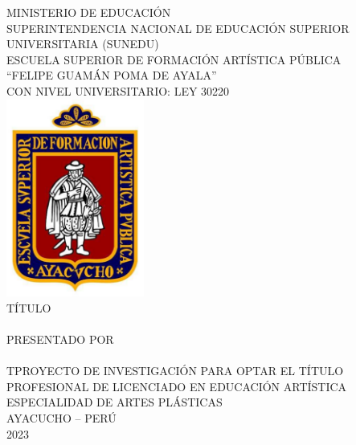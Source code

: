 \documentclass[12pt,a4paper]{article}
\begin{document}
\setlength{\abovecaptionskip}{0pt}
\setlength{\belowcaptionskip}{0pt}

\thispagestyle{empty}

{
\normalsize\centering\thispagestyle{empty}
MINISTERIO DE EDUCACIÓN
\\SUPERINTENDENCIA NACIONAL DE EDUCACIÓN SUPERIOR UNIVERSITARIA (SUNEDU)\\
\vspace{0.65cm}
{\large ESCUELA SUPERIOR DE FORMACIÓN ARTÍSTICA PÚBLICA\\ ``FELIPE GUAMÁN POMA DE AYALA''}\\
{\scriptsize CON NIVEL UNIVERSITARIO: LEY 30220}\\
\vspace{0.65cm}
\includegraphics[height=6.5cm]{logo}\\
\vspace{0.65cm}
{\large TÍTULO}\\
\vspace{0.65cm}
\MakeUppercase{\Large\titulo}\\
\vspace{0.65cm}
{
	\large PRESENTADO POR\\
	\vspace{0.65cm}
	\autor
}\\
\vspace{0.65cm}
\large TPROYECTO DE INVESTIGACIÓN PARA OPTAR EL TÍTULO PROFESIONAL DE LICENCIADO EN EDUCACIÓN ARTÍSTICA\\
\vspace{0.3cm}
ESPECIALIDAD DE ARTES PLÁSTICAS\\
\vspace{0.3cm}
AYACUCHO -- PERÚ\\
\vfill
{2023}

}

\newpage{}
\newpage
\end{document}
